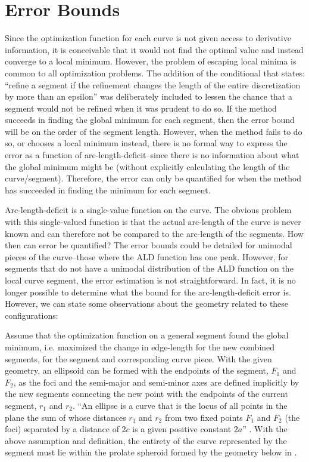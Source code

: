 \section{Error Bounds}
Since the optimization function for each curve is not given access to derivative information, it is conceivable that it would not find the optimal value and instead converge to a local minimum.  However, the problem of escaping local minima is common to all optimization problems.  The addition of the conditional that states: ``refine a segment if the refinement changes the length of the entire discretization by more than an epsilon'' was deliberately included to lessen the chance that a segment would not be refined when it was prudent to do so.  If the method succeeds in finding the global minimum for each segment, then the error bound will be on the order of the segment length.  However, when the method fails to do so, or chooses a local minimum instead, there is no formal way to express the error as a function of arc-length-deficit--since there is no information about what the global minimum might be (without explicitly calculating the length of the curve/segment).  Therefore, the error can only be quantified for when the method has succeeded in finding the minimum for each segment.

Arc-length-deficit is a single-value function on the curve.  The obvious problem with this single-valued function is that the actual arc-length of the curve is never known and can therefore not be compared to the arc-length of the segments.  How then can error be quantified? The error bounds could be detailed for unimodal pieces of the curve--those where the ALD function has one peak.  However, for segments that do not have a unimodal distribution of the ALD function on the local curve segment, the error estimation is not straightforward.  In fact, it is no longer possible to determine what the bound for the arc-length-deficit error is.  However, we can state some observations about the geometry related to these configurations:

Assume that the optimization function on a general segment found the global minimum, i.e. maximized the change in edge-length for the new combined segments, for the segment and corresponding curve piece.  With the given geometry, an ellipsoid can be formed with the endpoints of the segment, $F_1$ and $F_2$, as the foci and the semi-major and semi-minor axes are defined implicitly by the new segments connecting the new point with the endpoints of the current segment, $r_1$ and $r_2$.  ``An ellipse is a curve that is the locus of all points in the plane the sum of whose distances $r_1$ and $r_2$ from two fixed points $F_1$ and $F_2$ (the foci) separated by a distance of $2c$ is a given positive constant $2a$'' \cite{weissteine}.  With the above assumption and definition, the entirety of the curve represented by the segment must lie within the prolate spheroid  formed by the geometry below in .

